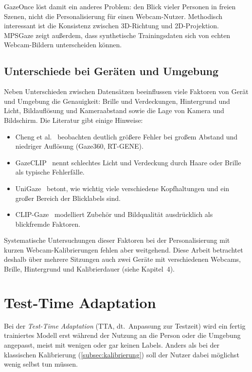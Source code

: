 GazeOnce löst damit ein anderes Problem: den Blick vieler Personen in freien
Szenen, nicht die Personalisierung für einen Webcam-Nutzer. Methodisch
interessant ist die Konsistenz zwischen 3D-Richtung und 2D-Projektion. MPSGaze
zeigt außerdem, dass synthetische Trainingsdaten sich von echten
Webcam-Bildern unterscheiden können.

\subsection{Unterschiede bei Geräten und Umgebung}
\label{subsec:geraete}
Neben Unterschieden zwischen Datensätzen beeinflussen viele Faktoren von Gerät
und Umgebung die Genauigkeit: Brille und Verdeckungen, Hintergrund und Licht,
Bildauflösung und Kameraabstand sowie die Lage von Kamera und Bildschirm. Die
Literatur gibt einige Hinweise:
\begin{itemize}
  \item Cheng et al.~\cite{cheng2024review} beobachten deutlich größere Fehler
        bei großem Abstand und niedriger Auflösung (Gaze360, RT-GENE).
  \item GazeCLIP~\cite{wang2026gazeclip} nennt schlechtes Licht und
        Verdeckung durch Haare oder Brille als typische Fehlerfälle.
  \item UniGaze~\cite{qin2026unigaze} betont, wie wichtig viele verschiedene
        Kopfhaltungen und ein großer Bereich der Blicklabels sind.
  \item CLIP-Gaze~\cite{yin2024clipgaze} modelliert Zubehör und Bildqualität
        ausdrücklich als blickfremde Faktoren.
\end{itemize}
Systematische Untersuchungen dieser Faktoren bei der Personalisierung mit
kurzen Webcam-Kalibrierungen fehlen aber weitgehend. Diese Arbeit betrachtet
deshalb über mehrere Sitzungen auch zwei Geräte mit verschiedenen Webcams,
Brille, Hintergrund und Kalibrierdauer (siehe Kapitel~4).

\section{Test-Time Adaptation}
\label{sec:tta}
Bei der \emph{Test-Time Adaptation} (TTA, dt.\ Anpassung zur Testzeit) wird ein fertig
trainiertes Modell erst während der Nutzung an die Person oder die Umgebung
angepasst, meist mit wenigen oder gar keinen Labels. Anders als bei der
klassischen Kalibrierung (\cref{subsec:kalibrierung}) soll der Nutzer dabei
möglichst wenig selbst tun müssen.

